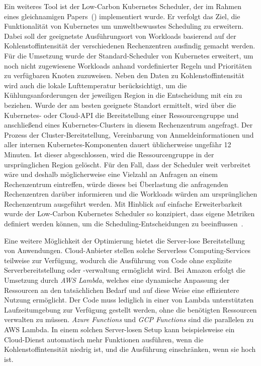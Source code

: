 Ein weiteres Tool ist der Low-Carbon Kubernetes Scheduler, der im Rahmen eines gleichnamigen Papers~(\cite{James.}) implementiert wurde.
Er verfolgt das Ziel, die Funktionalität von Kubernetes um umweltbewusstes Scheduling zu erweitern.
Dabei soll der geeignetste Ausführungsort von Workloads basierend auf der Kohlenstoffintensität der verschiedenen Rechenzentren ausfindig gemacht werden.
Für die Umsetzung wurde der Standard-Scheduler von Kubernetes erweitert, um noch nicht zugewiesene Workloads anhand vordefinierter Regeln und Prioritäten zu verfügbaren Knoten zuzuweisen.
Neben den Daten zu Kohlenstoffintensität wird auch die lokale Lufttemperatur berücksichtigt, um die Kühlungsanforderungen der jeweiligen Region in die Entscheidung mit ein zu beziehen.
Wurde der am besten geeignete Standort ermittelt, wird über die Kubernetes- oder Cloud-\ac{API} die Bereitstellung einer Ressourcengruppe und anschließend eines Kubernetes-Clusters in diesem Rechenzentrum angefragt.
Der Prozess der Cluster-Bereitstellung, Vereinbarung von Anmeldeinformationen und aller internen Kubernetes-Komponenten dauert üblicherweise ungefähr 12 Minuten.
Ist dieser abgeschlossen, wird die Ressourcengruppe in der ursprünglichen Region gelöscht.
Für den Fall, dass der Scheduler weit verbreitet wäre und deshalb möglicherweise eine Vielzahl an Anfragen an einem Rechenzentrum eintreffen, würde dieses bei Überlastung die anfragenden Rechenzentren darüber informieren und die Workloads würden am ursprünglichen Rechenzentrum ausgeführt werden.
Mit Hinblick auf einfache Erweiterbarkeit wurde der Low-Carbon Kubernetes Scheduler so konzipiert, dass eigene Metriken definiert werden können, um die Scheduling-Entscheidungen zu beeinflussen~\cite{James.}.

Eine weitere Möglichkeit der Optimierung bietet die Server-lose Bereitstellung von Anwendungen.
Cloud-Anbieter stellen solche Serverless Computing-Services teilweise zur Verfügung, wodurch die Ausführung von Code ohne explizite Serverbereitstellung oder -verwaltung ermöglicht wird.
Bei Amazon erfolgt die Umsetzung durch \textit{AWS Lambda}, welches eine dynamische Anpassung der Ressourcen an den tatsächlichen Bedarf und auf diese Weise eine effizientere Nutzung ermöglicht.
Der Code muss lediglich in einer von Lambda unterstützten Laufzeitumgebung zur Verfügung gestellt werden, ohne die benötigten Ressourcen verwalten zu müssen.
\textit{Azure Functions} und \textit{\ac{GCP} Functions} sind die parallelen zu \ac{AWS} Lambda.
In einem solchen Server-losen Setup kann beispielsweise ein Cloud-Dienst automatisch mehr Funktionen ausführen, wenn die Kohlenstoffintensität niedrig ist, und die Ausführung einschränken, wenn sie hoch ist.

